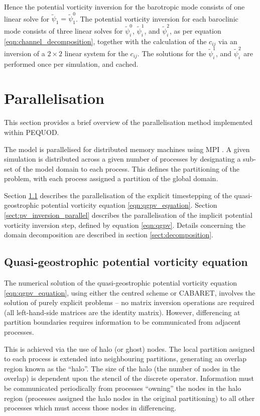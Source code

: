 \documentclass[a4paper]{book}
\newcommand{\pequod}{PEQUOD}
\begin{document}
Hence the potential vorticity inversion for the barotropic mode consists
of one linear solve for $\tilde{\psi}_1 = \tilde{\psi}^0_1$. The potential
vorticity inversion for each baroclinic mode consists of three linear solves for
$\tilde{\psi}^0_i$, $\tilde{\psi}^1_i$, and $\tilde{\psi}^2_i$, as per equation
\eqref{eqn:channel_decomposition}, together with the calculation of the
$c_{ij}$ via an inversion of a $2 \times 2$ linear system for the $c_{ij}$. The
solutions for the $\tilde{\psi}^1_i$, and $\tilde{\psi}^2_i$ are performed
once per simulation, and cached.

\chapter{Parallelisation}\label{sect:parallel}

This section provides a brief overview of the parallelisation method implemented
within \pequod.

The model is parallelised for distributed memory machines using MPI . A given
simulation is distributed across a given number of processes by designating a
sub-set of the model domain to each process. This defines the partitioning of
the problem, with each process assigned a partition of the global domain.

Section \ref{sect:qgpv_parallel} describes the parallelisation of the explicit
timestepping of the quasi-geostrophic potential vorticity equation
\eqref{eqn:qgpv_equation}. Section \ref{sect:pv_inversion_parallel} describes
the parallelisation of the implicit potential vorticity inversion step, defined
by equation \eqref{eqn:qgpv}. Details concerning the domain decomposition are
described in section \ref{sect:decomposition}.

\section{Quasi-geostrophic potential vorticity equation}\label{sect:qgpv_parallel}

The numerical solution of the quasi-geostrophic potential vorticity equation
\eqref{eqn:qgpv_equation}, using either the centred scheme or CABARET, involves
the solution of purely explicit problems -- no matrix inversion operations are
required (all left-hand-side matrices are the identity matrix). However,
differencing at partition boundaries requires information to be communicated
from adjacent processes.

This is achieved via the use of halo (or ghost) nodes. The local partition
assigned to each process is extended into neighbouring partitions, generating
an overlap region known as the ``halo''. The size of the halo (the number of
nodes in the overlap) is dependent upon the stencil of the discrete operator.
Information must be communicated periodically from processes ``owning'' the
nodes in the halo region (processes assigned the halo nodes in the original
partitioning) to all other processes which must access those nodes in
differencing.
\end{document}
